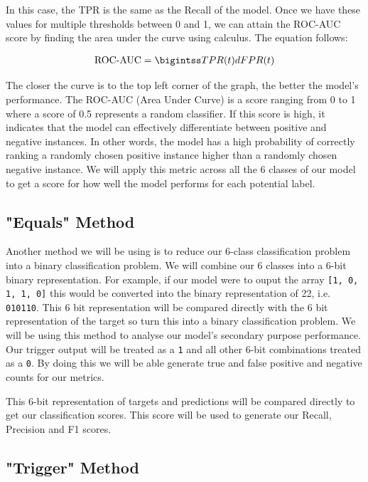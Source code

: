 In this case, the TPR is the same as the Recall of the model. Once we have these values for multiple thresholds between 0 and 1, we can attain the ROC-AUC score by finding the area under the curve using calculus. The equation follows:

\begin{equation}
    \begin{gathered}
        $$\text{ROC-AUC} = \bigintss TPR(t) dFPR(t)$$
    \end{gathered}
\end{equation}

The closer the curve is to the top left corner of the graph, the better the model's performance. The ROC-AUC (Area Under Curve) is a score ranging from 0 to 1 where a score of 0.5 represents a random classifier. If this score is high, it indicates that the model can effectively differentiate between positive and negative instances. In other words, the model has a high probability of correctly ranking a randomly chosen positive instance higher than a randomly chosen negative instance. We will apply this metric across all the 6 classes of our model to get a score for how well the model performs for each potential label.

\subsection{"Equals" Method}

Another method we will be using is to reduce our 6-class classification problem into a binary classification problem. We will combine our 6 classes into a 6-bit binary representation. For example, if our model were to ouput the array \verb|[1, 0, 1, 1, 0]| this would be converted into the binary representation of 22, i.e. \verb|010110|. This 6 bit representation will be compared directly with the 6 bit representation of the target so turn this into a binary classification problem. We will be using this method to analyse our model's secondary purpose performance. Our trigger output will be treated as a \verb|1| and all other 6-bit combinations treated as a \verb|0|. By doing this we will be able generate true and false positive and negative counts for our metrics.

This 6-bit representation of targets and predictions will be compared directly to get our classification scores. This score will be used to generate our Recall, Precision and F1 scores.

\subsection{"Trigger" Method}

